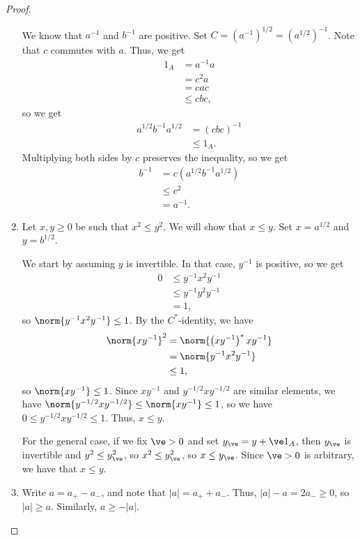 \documentclass[10pt]{mypackage}
\begin{document}
\begin{proof}
\begin{enumerate}[(1)]
      We know that $a^{-1}$ and $b^{-1}$ are positive. Set $C = \left(a^{-1}\right)^{1/2} = \left(a^{1/2}\right)^{-1}$. Note that $c$ commutes with $a$. Thus, we get
      \begin{align*}
        1_A &= a^{-1}a\\
            &= c^2a\\
            &= cac\\
            &\leq cbc,
      \end{align*}
      so we get
      \begin{align*}
        a^{1/2}b^{-1}a^{1/2} &= \left(cbc\right)^{-1}\\
                             &\leq 1_A.
      \end{align*}
      Multiplying both sides by $c$ preserves the inequality, so we get
      \begin{align*}
        b^{-1} &= c\left(a^{1/2}b^{-1}a^{1/2}\right)\\
               &\leq c^2\\
               &= a^{-1}.
      \end{align*}
    \item Let $x,y\geq 0$ be such that $x^2 \leq y^2$. We will show that $x \leq y$. Set $x = a^{1/2}$ and $y=b^{1/2}$.\newline

      We start by assuming $y$ is invertible. In that case, $y^{-1}$ is positive, so we get
      \begin{align*}
        0 &\leq y^{-1}x^2y^{-1}\\
          &\leq y^{-1}y^2y^{-1}\\
          &= 1,
      \end{align*}
      so $\norm{y^{-1}x^2y^{-1}} \leq 1$. By the $C^{\ast}$-identity, we have
      \begin{align*}
        \norm{xy^{-1}}^2 &= \norm{\left(xy^{-1}\right)^{\ast}xy^{-1}}\\
                         &= \norm{y^{-1}x^2y^{-1}}\\
                         &\leq 1,
      \end{align*}
      so $\norm{xy^{-1}}\leq 1$. Since $xy^{-1}$ and $y^{-1/2}xy^{-1/2}$ are similar elements, we have $\norm{y^{-1/2}xy^{-1/2}}\leq \norm{xy^{-1}}\leq 1$, so we have $0\leq y^{-1/2}xy^{-1/2}\leq 1$. Thus, $x\leq y$.\newline

      For the general case, if we fix $\ve > 0$ and set $y_{\ve} = y + \ve 1_A$, then $y_{\ve}$ is invertible and $y^2 \leq y_{\ve}^2$, so $x^2 \leq y_{\ve}^2$, so $x\leq y_{\ve}$. Since $\ve > 0$ is arbitrary, we have that $x \leq y$.
    \item Write $a = a_{+} - a_{-}$, and note that $\left\vert a \right\vert = a_{+} + a_{-}$. Thus, $\left\vert a \right\vert -a = 2a_{-} \geq 0$, so $\left\vert a \right\vert \geq a$. Similarly, $a \geq -\left\vert a \right\vert$.
  \end{enumerate}
\end{proof}
\end{document}
